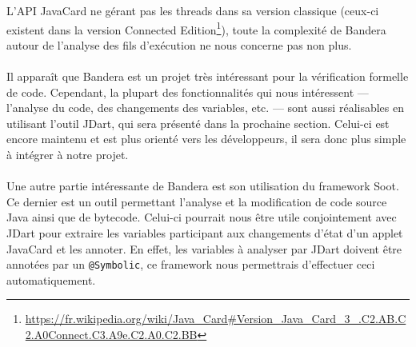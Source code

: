 L'API JavaCard ne gérant pas les threads dans sa version
classique (ceux-ci existent dans la version Connected
Edition\footnote{\url{https://fr.wikipedia.org/wiki/Java_Card\#Version_Java_Card_3_.C2.AB.C2.A0Connect.C3.A9e.C2.A0.C2.BB}}),
toute la complexité de Bandera autour de l'analyse des fils
d'exécution ne nous concerne pas non plus.

\paragraph{}
Il apparaît que Bandera est un projet très intéressant pour la
vérification formelle de code. Cependant, la plupart des
fonctionnalités qui nous intéressent --- l'analyse du code, des
changements des variables, etc. --- sont aussi réalisables en
utilisant l'outil JDart, qui sera présenté dans la prochaine
section. Celui-ci est encore maintenu et est plus orienté vers les
développeurs, il sera donc plus simple à intégrer à notre projet.

\paragraph{}
Une autre partie intéressante de Bandera est son utilisation du
framework Soot. Ce dernier est un outil permettant l'analyse et la
modification de code source Java ainsi que de bytecode. Celui-ci
pourrait nous être utile conjointement avec JDart pour extraire les
variables participant aux changements d'état d'un applet JavaCard et
les annoter. En effet, les variables à analyser par JDart doivent être
annotées par un \verb|@Symbolic|, ce framework nous permettrais
d'effectuer ceci automatiquement.
